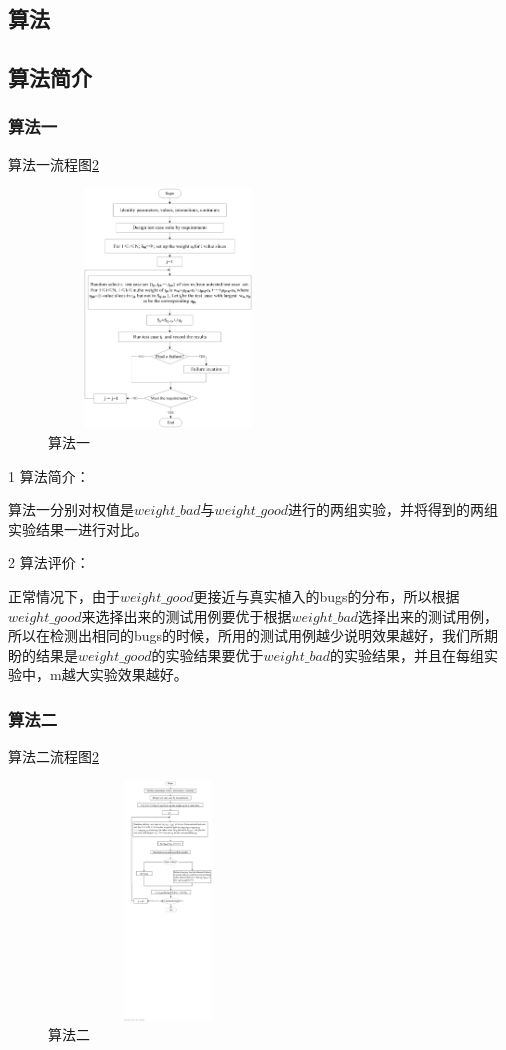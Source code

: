 \documentclass[10pt,journal,letterpaper,compsoc]{IEEEtran}
\begin{document}
\begin{CJK}{UTF8}{gkai}
\section{算法}
\subsection{算法简介}
	\subsubsection{算法一}

算法一流程图\ref{fig:ARCH}
\begin{figure}[htb]
  \centering
  \includegraphics[width=2.5in,height=2.5in]{./CT/CT1.eps}
  \caption{算法一}
  \label{fig:ARCH}
\end{figure}

1 算法简介：

   算法一分别对权值是$weight\_bad$与$weight\_good$进行的两组实验，并将得到的两组实验结果一进行对比。
   
2 算法评价：

   正常情况下，由于$weight\_good$更接近与真实植入的bugs的分布，所以根据$weight\_good$来选择出来的测试用例要优于根据$weight\_bad$选择出来的测试用例，所以在检测出相同的bugs的时候，所用的测试用例越少说明效果越好，我们所期盼的结果是$weight\_good$的实验结果要优于$weight\_bad$的实验结果，并且在每组实验中，m越大实验效果越好。
	\subsubsection{算法二}

算法二流程图\ref{fig:ARCH}
 \begin{figure}[htb]
   \centering
   \includegraphics[width=2.5in,height=2.5in]{./CT/CT2.eps}
   \caption{算法二}
   \label{fig:ARCH}
 \end{figure}


\end{CJK}
\end{document}

